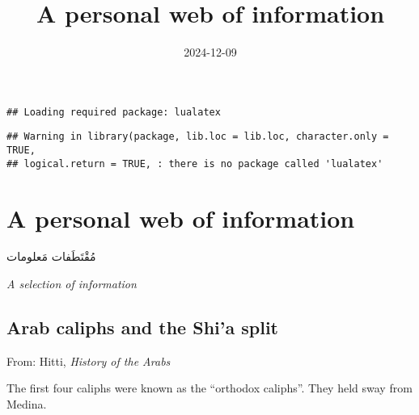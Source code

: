 \documentclass[
]{book}
\title{A personal web of information}
\author{}
\date{\vspace{-2.5em}2024-12-09}
\begin{document}
\frontmatter
\maketitle

\mainmatter
\begin{verbatim}
## Loading required package: lualatex
\end{verbatim}

\begin{verbatim}
## Warning in library(package, lib.loc = lib.loc, character.only = TRUE,
## logical.return = TRUE, : there is no package called 'lualatex'
\end{verbatim}

\chapter{A personal web of
information}\label{a-personal-web-of-information}

مُقْتَطَفات مَعلومات

\emph{A selection of information}

\section{Arab caliphs and the Shi'a
split}\label{arab-caliphs-and-the-shia-split}

From: Hitti, \emph{History of the Arabs}

The first four caliphs were known as the ``orthodox caliphs''. They held
sway from Medina.
\end{document}
